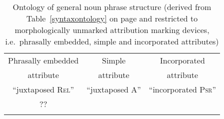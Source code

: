 \begin{table}
\begin{tabular}{c c c}
\lsptoprule
Phrasally embedded			&Simple					&Incorporated\\
attribute					&attribute					&attribute\\
\midrule
“juxtaposed \textsc{Rel}”		&“juxtaposed \textsc{A}”		&“incorporated \textsc{Psr}”\\
\midrule
??\\
\lspbottomrule
\end{tabular}
\caption[Ontology of general noun phrase structure]{Ontology of general noun phrase structure (derived from Table~\ref{syntaxontology} on page \pageref{syntaxontology} and restricted to morphologically unmarked attribution marking devices, i.e.~phrasally embedded, simple and incorporated attributes)}\label{ontologyderived}
\end{table}

